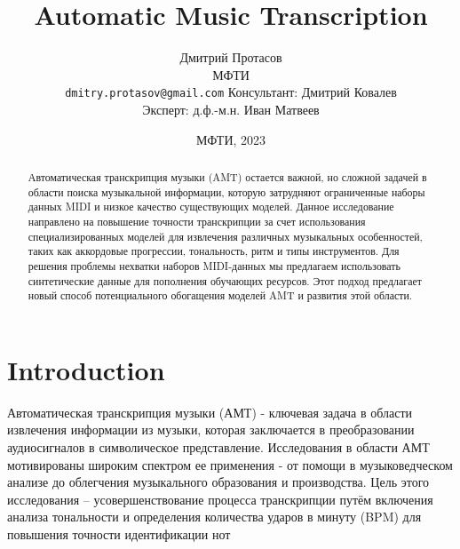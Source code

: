\documentclass[a4paper, 12pt]{article} %
\title{Automatic Music Transcription}
\author{
Дмитрий Протасов\\
МФТИ\\ 
\texttt{dmitry.protasov@gmail.com} 
\AND
Консультант: Дмитрий Ковалев\\
\AND
Эксперт: д.ф.-м.н. Иван Матвеев\\
}
\date{МФТИ, 2023}
\begin{document}
\maketitle

\begin{abstract}
    Автоматическая транскрипция музыки (AMT) остается важной, но сложной задачей в области поиска музыкальной информации, которую затрудняют ограниченные наборы данных MIDI и низкое качество существующих моделей. Данное исследование направлено на повышение точности транскрипции за счет использования специализированных моделей для извлечения различных музыкальных особенностей, таких как аккордовые прогрессии, тональность, ритм и типы инструментов. Для решения проблемы нехватки наборов MIDI-данных мы предлагаем использовать синтетические данные для пополнения обучающих ресурсов. Этот подход предлагает новый способ потенциального обогащения моделей AMT и развития этой области.
\end{abstract}



\section{Introduction}


Автоматическая транскрипция музыки (АМТ) - ключевая задача в области извлечения информации из музыки, которая заключается в преобразовании аудиосигналов в символическое представление. Исследования в области АМТ мотивированы широким спектром ее применения - от помощи в музыковедческом анализе до облегчения музыкального образования и производства. Цель этого исследования -- усовершенствование процесса транскрипции путём включения анализа тональности и определения количества ударов в минуту (BPM) для повышения точности идентификации нот%

\end{document}
